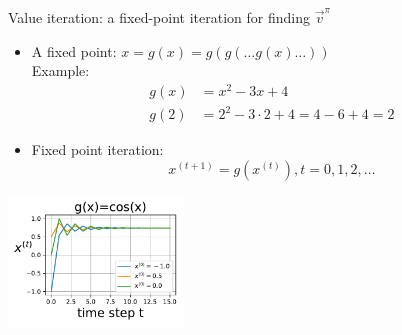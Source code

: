 \begin{frame}\frametitle{\subsubsecname}

Value iteration: a fixed-point iteration for finding $\vec v^\pi$

\begin{itemize}
\item A fixed point: $x=g(x)=g(g(\ldots g(x)\ldots))$\\

Example:
\begin{align}
    g(x) &= x^{2} - 3x + 4\\
    g(2) &= 2^{2} - 3\cdot 2 + 4 = 4 - 6 + 4 = 2
\end{align}

\item Fixed point iteration:
\begin{equation}
x^{(t+1)} = g(x^{(t)}), t=0,1,2,\ldots
\end{equation}
\end{itemize}

\begin{center}
    \includegraphics[height=3.5cm]{img/fixed_point_iter_cos} 
\end{center}

\end{frame}


